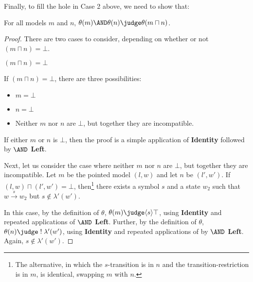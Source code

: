 Finally, to fill the hole in Case 2 above, we need to show that:
\begin{lemma}
For all models $m$ and $n$, $\theta(m) \AND \theta(n) \judge \theta (m \sqcap n)$.
\end{lemma}

\begin{proof}

There are two cases to consider, depending on whether or not $(m \sqcap n) = \bot$.

\setcounter{mycase}{0}

\begin{mycase}
$(m \sqcap n) = \bot$
\end{mycase}
If $(m \sqcap n) = \bot$, there are three possibilities:
\begin{itemize}
\item
$m = \bot$
\item
$n = \bot$
\item
Neither $m$ nor $n$ are $\bot$, but together they are incompatible. 
\end{itemize}
If either $m$ or $n$ is $\bot$, then the proof is a simple application of {\bf Identity} followed by {\bf $\AND$ Left}.

Next, let us consider the case where neither $m$ nor $n$ are $\bot$, but together they are incompatible.
Let $m$ be the pointed model $(l, w)$ and let $n$ be $(l', w')$.
If $(l, w) \sqcap (l', w') = \bot$, then\footnote{The alternative, in which the $s$-transition is in $n$ and the transition-restriction is in $m$, is identical, swapping $m$ with $n$.} there exists a symbol $s$ and a state $w_2$ such that $w \xrightarrow{s} w_2$ but $s \notin \lambda'(w')$.

In this case, by the definition of $\theta$, $\theta(m) \judge \langle s \rangle \top$, using  {\bf Identity} and repeated applications of {\bf $\AND$ Left}.
Further, by the definition of $\theta$, $\theta(n) \judge \; ! \; \lambda'(w')$, using  {\bf Identity} and repeated applications of by {\bf $\AND$ Left}. Again, $s \notin  \lambda'(w')$.


\end{proof}
